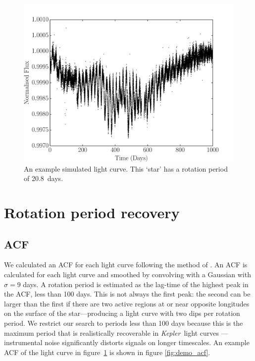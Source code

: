 \documentclass[useAMS, usenatbib, preprint, 12pt]{aastex}
\newcommand{\naigrain}{333}
\newcommand{\aigrainexampleperiod}{20.8}
\newcommand{\Kepler}{{\it Kepler}}
\newcommand{\kepler}{\Kepler}
\begin{document}
\begin{figure}
\begin{center}
\includegraphics[width=6in, clip=true]{figures/demo_lc.pdf}
\caption[A simulated light curve.]
{An example simulated light curve. This `star' has a rotation period of
\aigrainexampleperiod\ days.}
\label{fig:demo_lc}
\end{center}
\end{figure}


\section{Rotation period recovery}
\label{sec:method}
\subsection{ACF}

We calculated an ACF for each light curve following the method of
\citet{Mcquillan2013}.
An ACF is calculated for each light curve and smoothed by convolving with a
Gaussian with $\sigma=9$ days.
A rotation period is estimated as the lag-time of the highest peak in the ACF,
less than 100 days.
This is not always the first peak: the second can be larger than the first if
there are two active regions at or near opposite longitudes on the surface of
the star---producing a light curve with two dips per rotation period.
We restrict our search to periods less than 100 days because this is the
maximum period that is realistically recoverable in \kepler\ light curves ---
instrumental noise significantly distorts signals on longer timescales.
An example ACF of the light curve in figure~\ref{fig:demo_lc} is shown
in figure \ref{fig:demo_acf}.
\end{document}
